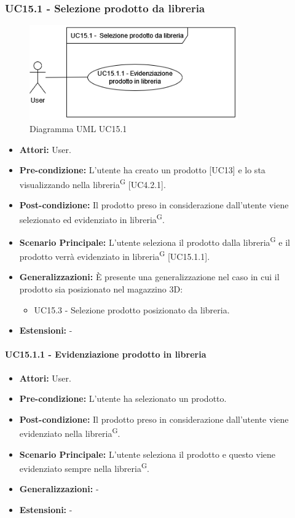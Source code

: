 \subsubsection{UC15.1 - Selezione prodotto da libreria}
\begin{figure}[H]
  \centering
  \includegraphics[width=0.8\textwidth]{UC_diagrams_11-20/UC15.1.drawio.png}
   \caption{Diagramma UML UC15.1}
\end{figure}
\begin{itemize}
    \item \textbf{Attori:} User.
    \item \textbf{Pre-condizione:}  L'utente ha creato un prodotto [UC13] e lo sta visualizzando nella libreria\textsuperscript{G} [UC4.2.1].
    \item \textbf{Post-condizione:} Il prodotto preso in considerazione dall'utente viene selezionato ed evidenziato in libreria\textsuperscript{G}.
    \item \textbf{Scenario Principale:} L'utente seleziona il prodotto dalla libreria\textsuperscript{G} e il prodotto verrà evidenziato in libreria\textsuperscript{G} [UC15.1.1].
    \item \textbf{Generalizzazioni:} È presente una generalizzazione nel caso in cui il prodotto sia posizionato nel magazzino 3D:
    \begin{itemize}
        \item UC15.3 - Selezione prodotto posizionato da libreria.
    \end{itemize}
    \item \textbf{Estensioni:} -
\end{itemize}


\paragraph{UC15.1.1 - Evidenziazione prodotto in libreria}
\begin{itemize}
    \item \textbf{Attori:} User.
    \item \textbf{Pre-condizione:}  L'utente ha selezionato un prodotto.
    \item \textbf{Post-condizione:} Il prodotto preso in considerazione dall'utente viene evidenziato nella libreria\textsuperscript{G}.
    \item \textbf{Scenario Principale:} L'utente seleziona il prodotto e questo viene evidenziato sempre nella libreria\textsuperscript{G}.
    \item \textbf{Generalizzazioni:} -
    \item \textbf{Estensioni:} -
\end{itemize}


